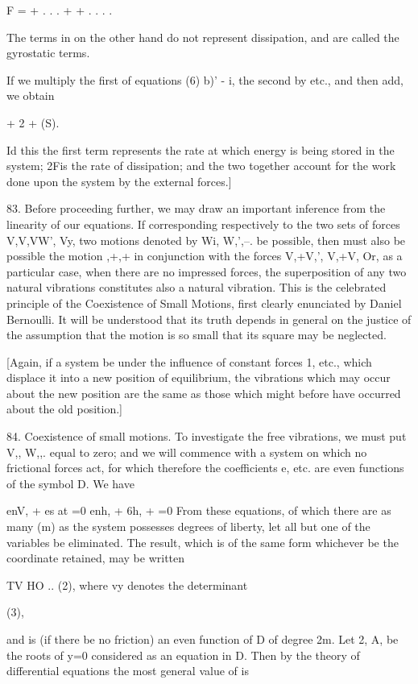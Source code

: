 F = + . . . + + . . . .

The terms in on the other hand do not represent dissipation, and are called the
gyrostatic terms.

If we multiply the first of equations (6) b)' - i, the second by etc., and then
add, we obtain

+ 2 + (S).

Id this the first term represents the rate at which energy is being stored in
the system; 2Fis the rate of dissipation; and the two together account for the
work done upon the system by the external forces.]

83. Before proceeding further, we may draw an important inference from the
linearity of our equations. If corresponding respectively to the two sets of
forces V,V,VW', Vy, two motions denoted by Wi, W,',--. be possible, then must
also be possible the motion ,+,+ in conjunction with the forces V,+V,', V,+V,
Or, as a particular case, when there are no impressed forces, the superposition
of any two natural vibrations constitutes also a natural vibration. This is the
celebrated principle of the Coexistence of Small Motions, first clearly
enunciated by Daniel Bernoulli. It will be understood that its truth depends in
general on the justice of the assumption that the motion is so small that its
square may be neglected.

[Again, if a system be under the influence of constant forces 1, etc., which
displace it into a new position of equilibrium, the vibrations which may occur
about the new position are the same as those which might before have occurred
about the old position.]

84. Coexistence of small motions. To investigate the free vibrations, we
must put V,, W,,. equal to zero; and we will commence with a system on which no
frictional forces act, for which therefore the coefficients e, etc. are even
functions of the symbol D. We have

enV, + es at =0 enh, + 6h, + =0 From these equations, of which there are as
many (m) as the system possesses degrees of liberty, let all but one of the
variables be eliminated. The result, which is of the same form whichever be the
coordinate retained, may be written

TV HO .. (2), where vy denotes the determinant

(3),

and is (if there be no friction) an even function of D of degree 2m. Let 2, A,
be the roots of y=0 considered as an equation in D. Then by the theory of
differential equations the most general value of is

